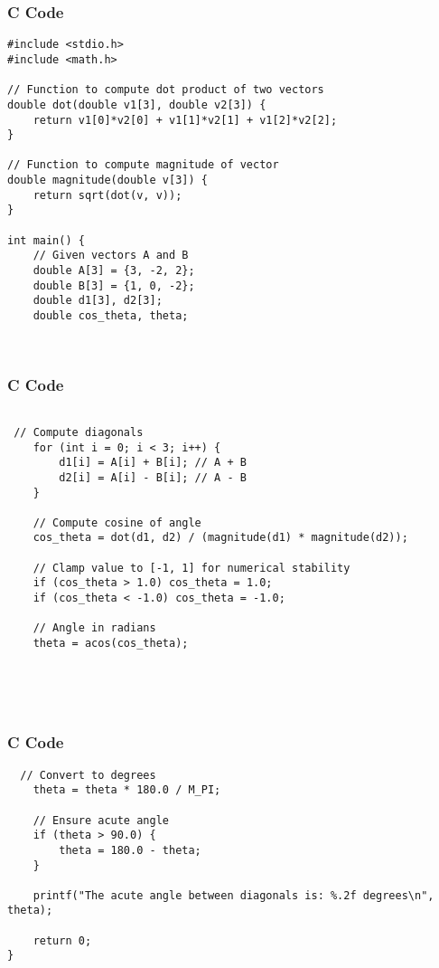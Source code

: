 \documentclass{beamer}
\begin{document}
\begin{frame}[fragile]
    \frametitle{C Code }
    \begin{lstlisting}
#include <stdio.h>
#include <math.h>

// Function to compute dot product of two vectors
double dot(double v1[3], double v2[3]) {
    return v1[0]*v2[0] + v1[1]*v2[1] + v1[2]*v2[2];
}

// Function to compute magnitude of vector
double magnitude(double v[3]) {
    return sqrt(dot(v, v));
}

int main() {
    // Given vectors A and B
    double A[3] = {3, -2, 2};
    double B[3] = {1, 0, -2};
    double d1[3], d2[3];
    double cos_theta, theta;

   

    \end{lstlisting}
\end{frame}




\begin{frame}[fragile]
    \frametitle{C Code}
    \begin{lstlisting}

 // Compute diagonals
    for (int i = 0; i < 3; i++) {
        d1[i] = A[i] + B[i]; // A + B
        d2[i] = A[i] - B[i]; // A - B
    }

    // Compute cosine of angle
    cos_theta = dot(d1, d2) / (magnitude(d1) * magnitude(d2));

    // Clamp value to [-1, 1] for numerical stability
    if (cos_theta > 1.0) cos_theta = 1.0;
    if (cos_theta < -1.0) cos_theta = -1.0;

    // Angle in radians
    theta = acos(cos_theta);

  



    \end{lstlisting}
\end{frame}







\begin{frame}[fragile]
    \frametitle{C Code}
    \begin{lstlisting}
  // Convert to degrees
    theta = theta * 180.0 / M_PI;

    // Ensure acute angle
    if (theta > 90.0) {
        theta = 180.0 - theta;
    }

    printf("The acute angle between diagonals is: %.2f degrees\n", theta);

    return 0;
}


    \end{lstlisting}
\end{frame}
\end{document}
